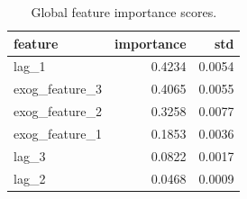 \begin{table}
\caption{Global feature importance scores.}
\label{tab:01_global_importance}
\begin{tabular}{lrr}
\toprule
feature & importance & std \\
\midrule
lag_1 & 0.4234 & 0.0054 \\
exog_feature_3 & 0.4065 & 0.0055 \\
exog_feature_2 & 0.3258 & 0.0077 \\
exog_feature_1 & 0.1853 & 0.0036 \\
lag_3 & 0.0822 & 0.0017 \\
lag_2 & 0.0468 & 0.0009 \\
\bottomrule
\end{tabular}
\end{table}
